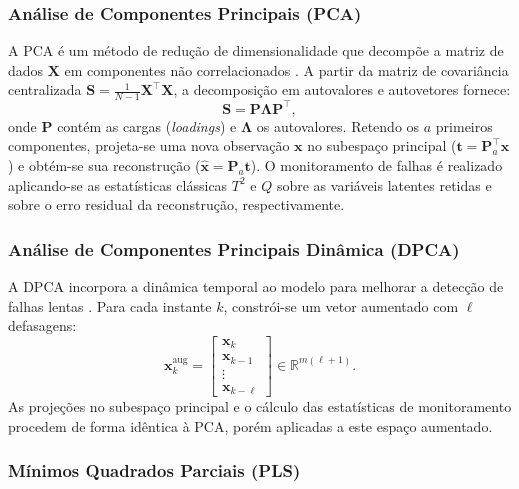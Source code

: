 \documentclass[journal]{IEEEtran}
\begin{document}
\subsubsection{Análise de Componentes Principais (PCA)}

A PCA é um método de redução de dimensionalidade que decompõe a matriz de dados $\mathbf{X}$ em componentes não correlacionados \cite{yin2012}. A partir da matriz de covariância centralizada $\mathbf{S} = \frac{1}{N-1}\mathbf{X}^\top\mathbf{X}$, a decomposição em autovalores e autovetores fornece:
\begin{equation}
\mathbf{S} = \mathbf{P} \boldsymbol{\Lambda} \mathbf{P}^\top,
\label{eq:pca_decomposition}
\end{equation}
onde $\mathbf{P}$ contém as cargas (\textit{loadings}) e $\boldsymbol{\Lambda}$ os autovalores. Retendo os $a$ primeiros componentes, projeta-se uma nova observação $\mathbf{x}$ no subespaço principal ($\mathbf{t} = \mathbf{P}_a^\top \mathbf{x}$) e obtém-se sua reconstrução ($\hat{\mathbf{x}} = \mathbf{P}_a \mathbf{t}$). O monitoramento de falhas é realizado aplicando-se as estatísticas clássicas $T^2$ e $Q$ sobre as variáveis latentes retidas e sobre o erro residual da reconstrução, respectivamente.

\subsubsection{Análise de Componentes Principais Dinâmica (DPCA)}

A DPCA incorpora a dinâmica temporal ao modelo para melhorar a detecção de falhas lentas \cite{favoreel2000}. Para cada instante $k$, constrói-se um vetor aumentado com $\ell$ defasagens:
\begin{equation}
\mathbf{x}^{\text{aug}}_k = \begin{bmatrix}
\mathbf{x}_k \\ \mathbf{x}_{k-1} \\ \vdots \\ \mathbf{x}_{k-\ell}
\end{bmatrix} \in \mathbb{R}^{m(\ell+1)}.
\label{eq:dpca_augmented}
\end{equation}
As projeções no subespaço principal e o cálculo das estatísticas de monitoramento procedem de forma idêntica à PCA, porém aplicadas a este espaço aumentado.

\subsubsection{Mínimos Quadrados Parciais (PLS)}
\end{document}
